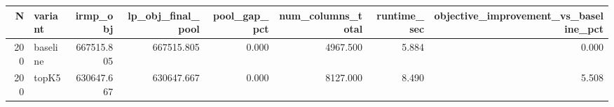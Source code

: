\begin{tabular}{rlrrrrrr}
\toprule
N & variant & irmp_obj & lp_obj_final_pool & pool_gap_pct & num_columns_total & runtime_sec & objective_improvement_vs_baseline_pct \\
\midrule
200 & baseline & 667515.805 & 667515.805 & 0.000 & 4967.500 & 5.884 & 0.000 \\
200 & topK5 & 630647.667 & 630647.667 & 0.000 & 8127.000 & 8.490 & 5.508 \\
\bottomrule
\end{tabular}
